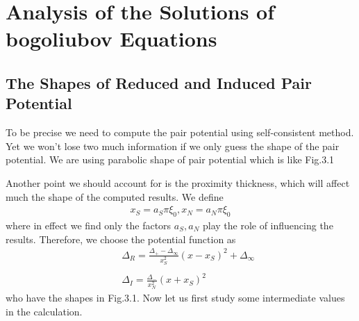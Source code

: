 \section{Analysis of the Solutions of bogoliubov Equations}
\subsection{The Shapes of Reduced and Induced Pair Potential}
To be precise we need to compute the pair potential using self-consistent method\citep{Reference11}. Yet we won't lose two much information if we only guess the shape of the pair potential\citep{Reference8, Reference4}. We are using parabolic shape of pair potential which is like Fig.3.1

Another point we should account for is the proximity thickness, which will affect much the shape of the computed results. We define
\begin{eqnarray}
x_S=a_S\pi\xi_0,x_N=a_N\pi\xi_0
\end{eqnarray}
where in effect we find only the factors $a_S,a_N$ play the role of influencing the results.
Therefore, we choose the potential function as 
\begin{eqnarray}
&&\Delta_R=\frac{\Delta_+-\Delta_{\infty}}{x_S^2}(x-x_S)^2+\Delta_{\infty}\nonumber\\
&&\\
&&\Delta_I=\frac{\Delta_-}{x_N^2}(x+x_S)^2\nonumber
\end{eqnarray}
who have the shapes in Fig.3.1.
Now let us first study some intermediate values in the calculation.

